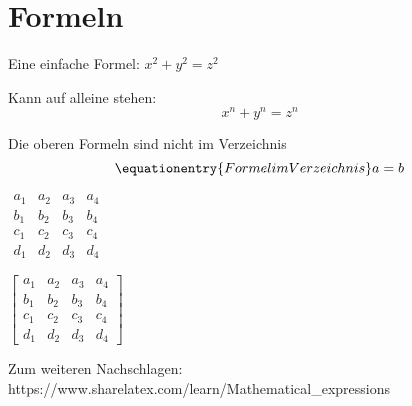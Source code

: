 \chapter{Formeln}

Eine einfache Formel: \(x^2 + y^2 = z^2\)

Kann auf alleine stehen: \[ x^n + y^n = z^n \]

Die oberen Formeln sind nicht im Verzeichnis
\begin{equation}\label{eq:Eq1}\equationentry{Formel im Verzeichnis}
   a=b 
\end{equation} 

$
\begin{matrix} 
a_1 & a_2 & a_3 & a_4 \\
b_1 & b_2 & b_3 & b_4 \\
c_1 & c_2 & c_3 & c_4 \\
d_1 & d_2 & d_3 & d_4
\end{matrix}
$

$
 \begin{bmatrix}
a_1 & a_2 & a_3 & a_4 \\
b_1 & b_2 & b_3 & b_4 \\
c_1 & c_2 & c_3 & c_4 \\
d_1 & d_2 & d_3 & d_4
\end{bmatrix}
$

Zum weiteren Nachschlagen:\\
https://www.sharelatex.com/learn/Mathematical\_expressions